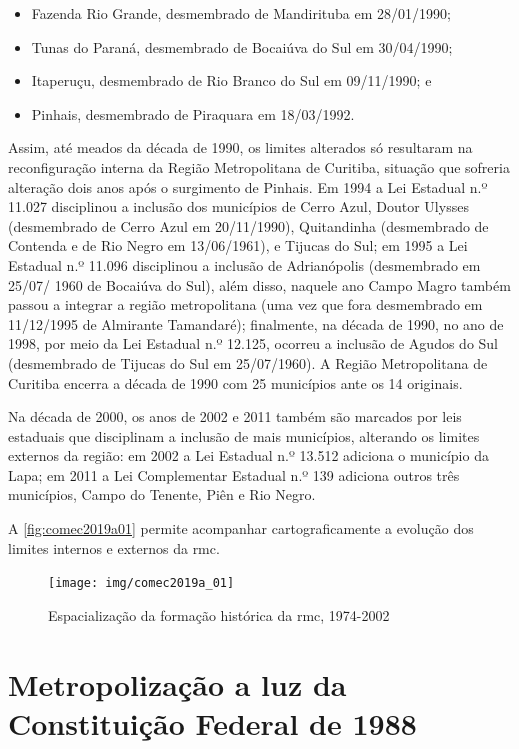 	\begin{itemize}
		\item Fazenda Rio Grande, desmembrado de Mandirituba em 28/01/1990;
		\item Tunas do Paraná, desmembrado de Bocaiúva do Sul em 30/04/1990;
		\item Itaperuçu, desmembrado de Rio Branco do Sul em 09/11/1990; e
		\item Pinhais, desmembrado de Piraquara em 18/03/1992.
	\end{itemize}
	
	Assim, até meados da década de 1990, os limites alterados só resultaram na reconfiguração interna da Região Metropolitana de Curitiba, situação que sofreria alteração dois anos após o surgimento de Pinhais. Em 1994 a Lei Estadual n.º 11.027 disciplinou a inclusão dos municípios de Cerro Azul, Doutor Ulysses (desmembrado de Cerro Azul em 20/11/1990), Quitandinha (desmembrado de Contenda e de Rio Negro em 13/06/1961), e Tijucas do Sul; em 1995 a Lei Estadual n.º 11.096 disciplinou a inclusão de Adrianópolis (desmembrado em 25/07/ 1960 de Bocaiúva do Sul), além disso, naquele ano Campo Magro também passou a integrar a região metropolitana (uma vez que fora desmembrado em 11/12/1995 de Almirante Tamandaré); finalmente, na década de 1990, no ano de 1998, por meio da Lei Estadual n.º 12.125, ocorreu a inclusão de Agudos do Sul (desmembrado de Tijucas do Sul em 25/07/1960). A Região Metropolitana de Curitiba encerra a década de 1990 com 25 municípios ante os 14 originais.
	
	Na década de 2000, os anos de 2002 e 2011 também são marcados por leis estaduais que disciplinam a inclusão de mais municípios, alterando os limites externos da região: em 2002 a Lei Estadual n.º 13.512 adiciona o município da Lapa; em 2011 a Lei Complementar Estadual n.º 139 adiciona outros três municípios, Campo do Tenente, Piên e Rio Negro.
	
	A \autoref{fig:comec2019a01} permite acompanhar cartograficamente a evolução dos limites internos e externos da \glsdesc{rmc}.
	
	\begin{figure}
		\centering
		\caption{Espacialização da formação histórica da \glsdesc{rmc}, 1974-2002}
		\label{fig:comec2019a01}
		\texttt{[image: img/comec2019a\_01]}
	\end{figure}
	
	\section{Metropolização a luz da Constituição Federal de 1988}
	
